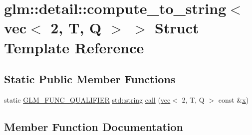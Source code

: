 \hypertarget{structglm_1_1detail_1_1compute__to__string_3_01vec_3_012_00_01_t_00_01_q_01_4_01_4}{}\section{glm\+:\+:detail\+:\+:compute\+\_\+to\+\_\+string$<$ vec$<$ 2, T, Q $>$ $>$ Struct Template Reference}
\label{structglm_1_1detail_1_1compute__to__string_3_01vec_3_012_00_01_t_00_01_q_01_4_01_4}
\subsection*{Static Public Member Functions}
\begin{DoxyCompactItemize}
\item 
static \hyperlink{setup_8hpp_a33fdea6f91c5f834105f7415e2a64407}{G\+L\+M\+\_\+\+F\+U\+N\+C\+\_\+\+Q\+U\+A\+L\+I\+F\+I\+ER} \hyperlink{_s_d_l__opengl__glext_8h_ae84541b4f3d8e1ea24ec0f466a8c568b}{std\+::string} \hyperlink{structglm_1_1detail_1_1compute__to__string_3_01vec_3_012_00_01_t_00_01_q_01_4_01_4_a53a9c1f76338785f54bb2638b69517ef}{call} (\hyperlink{structglm_1_1vec}{vec}$<$ 2, T, Q $>$ const \&\hyperlink{_s_d_l__opengl_8h_ad0e63d0edcdbd3d79554076bf309fd47}{x})
\end{DoxyCompactItemize}


\subsection{Member Function Documentation}
\mbox{\label{structglm_1_1detail_1_1compute__to__string_3_01vec_3_012_00_01_t_00_01_q_01_4_01_4_a53a9c1f76338785f54bb2638b69517ef}} 
